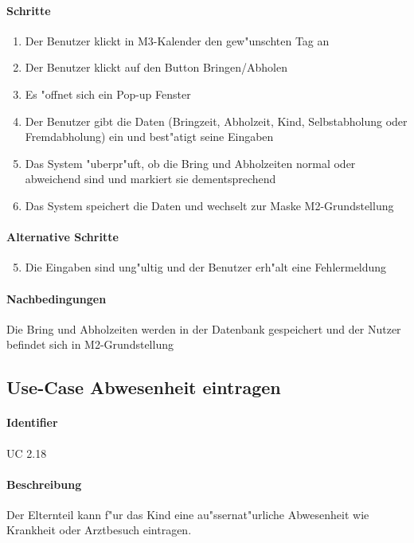   \paragraph{Schritte}
  \begin{enumerate}
   \item Der Benutzer klickt in M3-Kalender den gew"unschten Tag an
   \item Der Benutzer klickt auf den Button \dq Bringen/Abholen\dq
   \item Es "offnet sich ein Pop-up Fenster
   \item Der Benutzer gibt die Daten (Bringzeit, Abholzeit, Kind, Selbstabholung oder Fremdabholung) ein und best"atigt seine Eingaben
   \item Das System "uberpr"uft, ob die Bring und Abholzeiten normal oder abweichend sind und markiert sie dementsprechend
   \item Das System speichert die Daten und wechselt zur Maske M2-Grundstellung
  \end{enumerate}

  \paragraph{Alternative Schritte}
  \begin{enumerate}
  \setcounter{enumi}{4}
   \item  Die Eingaben sind ung"ultig und der Benutzer erh"alt eine Fehlermeldung
  \end{enumerate}

  \paragraph{Nachbedingungen}
  Die Bring und Abholzeiten werden in der Datenbank gespeichert und der Nutzer befindet sich in M2-Grundstellung

  
  \newpage
 \subsection{Use-Case Abwesenheit eintragen}
  \paragraph{Identifier}
  UC 2.18
  \paragraph{Beschreibung}
  Der Elternteil kann f"ur das Kind eine au"ssernat"urliche Abwesenheit wie Krankheit oder Arztbesuch eintragen.
